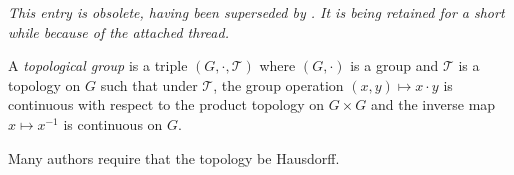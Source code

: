 \documentclass[12pt]{article}
\begin{document}

{\it This entry is obsolete, having been superseded by . It is being retained for a short while because of the attached thread.}

A \emph{topological group} is a triple $(G,\cdot,\mathcal{T})$ where $(G,\cdot)$ is a group and $\mathcal{T}$ is a topology on $G$ such that under $\mathcal{T}$, the group operation $(x,y)\mapsto x\cdot y$ is continuous with respect to the product topology on $G\times G$ and the inverse map $x\mapsto x^{-1}$ is continuous on $G$.

Many authors require that the topology be Hausdorff.
\end{document}
